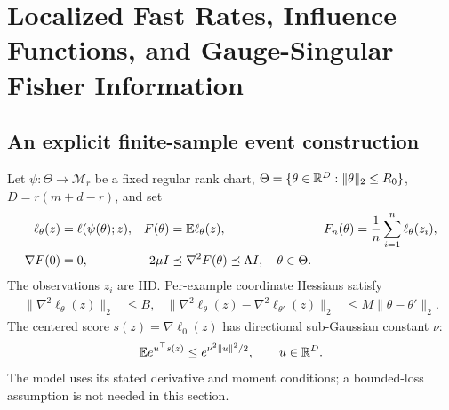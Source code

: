 \section{Localized Fast Rates, Influence Functions, and Gauge-Singular Fisher Information}
\label{app:local-statistics}


\subsection{An explicit finite-sample event construction}
\begin{assumption}
\label{ass:local-statistical-chart}
Let $\psi:\Theta\to\mathcal M_r$ be a fixed regular rank chart,
$\Theta=\{\theta\in\mathbb R^D:\|\theta\|_2\leq R_0\}$,
$D=r(m+d-r)$, and set
\begin{align}
\ell_\theta(z)&=\ell(\psi(\theta);z),&
F(\theta)&=\mathbb E\ell_\theta(z),&
F_n(\theta)&=\frac1n\sum_{i=1}^n\ell_\theta(z_i),\\
\nabla F(0)&=0,&
2\mu I&\preceq\nabla^2F(\theta)\preceq\Lambda I,\quad\theta\in\Theta .
\end{align}
The observations $z_i$ are IID. Per-example coordinate Hessians satisfy
\begin{align}
\|\nabla^2\ell_\theta(z)\|_2&\leq B,&
\|\nabla^2\ell_\theta(z)-\nabla^2\ell_{\theta'}(z)\|_2
&\leq M\|\theta-\theta'\|_2 .
\end{align}
The centered score $s(z)=\nabla\ell_0(z)$ has directional
sub-Gaussian constant $\nu$:
\begin{equation}
\mathbb E e^{u^\top s(z)}\leq e^{\nu^2\|u\|^2/2},
\qquad u\in\mathbb R^D .
\label{eq:local-score-model}
\end{equation}
The model uses its stated derivative and moment conditions; a
bounded-loss assumption is not needed in this section.
\end{assumption}

